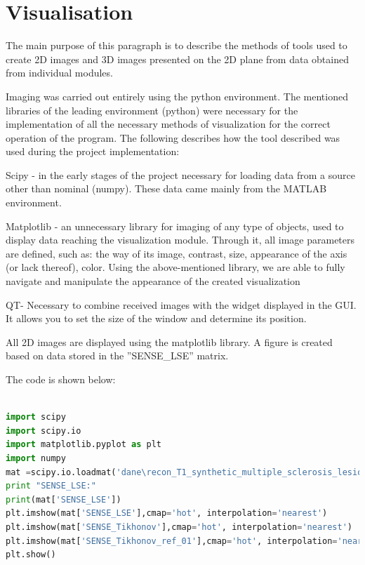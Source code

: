 \section{Visualisation}

The main purpose of this paragraph is to describe the methods of tools used to create 2D images and 3D images presented on the 2D plane from data obtained from individual modules.

Imaging was carried out entirely using the python environment. The mentioned libraries of the leading environment (python) were necessary for the implementation of all the necessary methods of visualization for the correct operation of the program. The following describes how the tool described was used during the project implementation:

Scipy - in the early stages of the project necessary for loading data from a source other than nominal (numpy). These data came mainly from the MATLAB environment.

Matplotlib - an unnecessary library for imaging of any type of objects, used to display data reaching the visualization module. Through it, all image parameters are defined, such as: the way of its image, contrast, size, appearance of the axis (or lack thereof), color.
Using the above-mentioned library, we are able to fully navigate and manipulate the appearance of the created visualization

QT- Necessary to combine received images with the widget displayed in the GUI. It allows you to set the size of the window and determine its position.

All 2D images are displayed using the matplotlib library. A figure is created based on data stored in the ''SENSE\_LSE'' matrix.

The code is shown below:

\begin{lstlisting}[language=Python, caption = Simple visualisation code.]

import scipy
import scipy.io
import matplotlib.pyplot as plt
import numpy
mat =scipy.io.loadmat('dane\recon_T1_synthetic_multiple_sclerosis_lesions_1mm_L16_r2.mat')
print "SENSE_LSE:"
print(mat['SENSE_LSE'])
plt.imshow(mat['SENSE_LSE'],cmap='hot', interpolation='nearest')
plt.imshow(mat['SENSE_Tikhonov'],cmap='hot', interpolation='nearest')
plt.imshow(mat['SENSE_Tikhonov_ref_01'],cmap='hot', interpolation='nearest')
plt.show()

\end{lstlisting}


